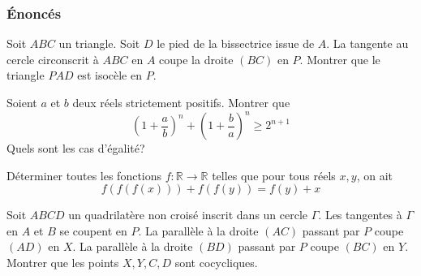 \subsubsection{Énoncés}
\begin{exo}
Soit $ABC$ un triangle. Soit $D$ le pied de la bissectrice issue de $A$. La tangente au cercle circonscrit à $ABC$ en $A$ coupe la droite $(BC)$ en $P$. Montrer que le triangle $PAD$ est isocèle en $P$.
\end{exo}


\begin{exo}
Soient $a$ et $b$ deux réels strictement positifs. Montrer que
$$\left(1+\frac{a}{b}\right)^n+\left(1+\frac{b}{a}\right)^n\geq 2^{n+1} $$
Quels sont les cas d'égalité?
\end{exo}


\begin{exo}
Déterminer toutes les fonctions $f:\mathbb{R}\to \mathbb{R}$ telles que pour tous réels $x,y$, on ait
$$f(f(f(x)))+f(f(y))=f(y)+x $$
\end{exo}


\begin{exo}
Soit $ABCD$ un quadrilatère non croisé inscrit dans un cercle $\Gamma$. Les tangentes à $\Gamma$ en $A$ et $B$ se coupent en $P$. La parallèle à la droite $(AC)$ passant par $P$ coupe $(AD)$ en $X$. La parallèle à la droite $(BD)$ passant par $P$ coupe $(BC)$ en $Y$. 
\\
Montrer que les points $X,Y,C,D$ sont cocycliques.
\end{exo}


